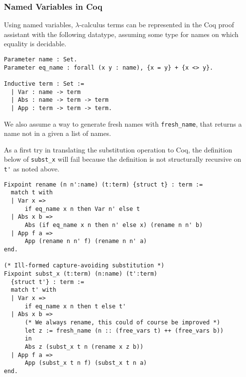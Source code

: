 \documentclass[a4paper,11pt]{article}
\begin{document}
\subsubsection*{Named Variables in Coq}

Using named variables, $\lambda$-calculus terms can be represented in the
Coq proof assistant with the following datatype, assuming some type for
names on which equality is decidable.
\begin{lstlisting}
Parameter name : Set.
Parameter eq_name : forall (x y : name), {x = y} + {x <> y}.

Inductive term : Set :=
  | Var : name -> term
  | Abs : name -> term -> term
  | App : term -> term -> term.
\end{lstlisting}
We also assume a way to generate fresh names with \lstinline{fresh_name},
that returns a name not in a given a list of names.

As a first try in translating the substitution operation to Coq, the
definition below of \lstinline{subst_x} will fail because the definition
is not structurally recursive on \lstinline{t'} as noted above.
\begin{lstlisting}
Fixpoint rename (n n':name) (t:term) {struct t} : term :=
  match t with
  | Var x =>
      if eq_name x n then Var n' else t
  | Abs x b =>
      Abs (if eq_name x n then n' else x) (rename n n' b)
  | App f a =>
      App (rename n n' f) (rename n n' a)
end.

(* Ill-formed capture-avoiding substitution *)
Fixpoint subst_x (t:term) (n:name) (t':term)
  {struct t'} : term :=
  match t' with
  | Var x =>
      if eq_name x n then t else t'
  | Abs x b =>
      (* We always rename, this could of course be improved *)
      let z := fresh_name (n :: (free_vars t) ++ (free_vars b))
      in
      Abs z (subst_x t n (rename x z b))
  | App f a =>
      App (subst_x t n f) (subst_x t n a)
end.
\end{lstlisting}
\end{document}
